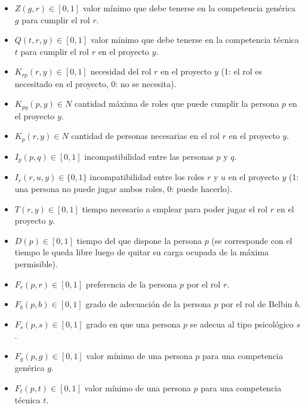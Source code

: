 \begin{itemize}
  \item $Z(g,r) \in [0,1]$ valor mínimo que debe tenerse en la competencia genérica $g$ para cumplir el rol $r$.
  
  \item $Q(t,r,y) \in [0,1]$ valor mínimo que debe tenerse en la competencia técnica $t$ para cumplir el rol $r$ en el proyecto $y$.
  
  \item $K_{rp}(r, y) \in [0,1]$ necesidad del rol $r$ en el proyecto $y$ (1: el rol es necesitado en el proyecto, 0: no se necesita).
  
  \item $K_{py}(p,y) \in N$ cantidad máxima de roles que puede cumplir la persona $p$ en el proyecto $y$.
  
  \item $K_{p}(r, y) \in N$ cantidad de personas necesarias en el rol $r$ en el proyecto $y$.
  \item $I_p(p,q) \in [0,1]$ incompatibilidad entre las personas $p$ y $q$.
  
  \item $I_r(r,u,y) \in \{0,1\}$ incompatibilidad entre los roles $r$ y $u$ en el proyecto $y$ (1: una persona no puede jugar ambos roles, 0: puede hacerlo).
  
  \item $T(r,y) \in [0,1]$ tiempo necesario a emplear para poder jugar el rol $r$ en el proyecto $y$.
  
  \item $D(p) \in [0,1]$ tiempo del que dispone la persona $p$ (se corresponde con el tiempo le queda libre luego de quitar su carga ocupada de la máxima permisible).

  
  \item $F_r(p,r) \in [0,1]$ preferencia de la persona $p$ por el rol $r$.
  
  \item $F_b(p,b) \in [0,1]$ grado de adecuación de la persona $p$ por el rol de Belbin $b$.
  
  \item $F_s(p,s) \in [0,1]$ grado en que una persona $p$ se adecua al tipo psicológico $s$.
  
  \item $F_g(p,g) \in [0,1]$ valor mínimo de una persona $p$ para una competencia genérica $g$.
  
  \item $F_t(p,t) \in [0,1]$ valor mínimo de una persona $p$ para una competencia técnica $t$.
\end{itemize}

